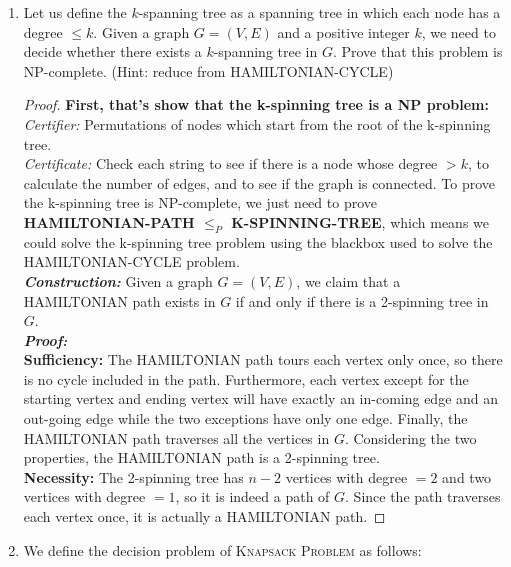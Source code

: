 \documentclass[12pt,a4paper]{article}
\theoremstyle{definition}
\begin{document}
\begin{enumerate}
\begin{proof}
	\\
	\textbf{Necessity:}
	If $G'$ has a clique of $K_b$, the set of whose vertices is $S$, the set $S$ is an independent set of $G$. Because all the incoming and outgoing edges of arbitrary vertex $u$ in $S$ are included in $K_b$, there is no edge connecting $u$ and any other nodes of $S$. As a result, $S$ is an independent set of $G$.
	\end{proof}
    \item Let us define the $k$-spanning tree as a spanning tree in which each node has a degree $\leqslant k$. Given a graph $G= (V,E)$ and a positive integer $k$, we need to decide whether there exists a $k$-spanning tree in $G$. Prove that this problem is NP-complete. (Hint: reduce from \textsc{HAMILTONIAN-CYCLE})
    \begin{proof}
    \textbf{First, that's show that the k-spinning tree is a NP problem:}
    \\
    \textit{Certifier:} Permutations of nodes which start from the root of the k-spinning tree.
    \\
    \textit{Certificate:} Check each string to see if there is a node whose degree $> k$, to calculate the number of edges, and to see if the graph is connected.
  	To prove the k-spinning tree is NP-complete, we just need to prove \textbf{\textsc{HAMILTONIAN-PATH }$\leq_P$\textsc{ K-SPINNING-TREE}}, which means we could solve the k-spinning tree problem using the blackbox used to solve the \textsc{HAMILTONIAN-CYCLE} problem. 
  	\\
  	\textit{\textbf{Construction: }}Given a graph $G=(V,E)$, we claim that a HAMILTONIAN path exists in $G$ if and only if there is a 2-spinning tree in $G$.
  	\\
  	\textbf{\textit{Proof:}}
  	\\
  	\textbf{Sufficiency:} The HAMILTONIAN path tours each vertex only once, so  there is no cycle included in the path. Furthermore, each vertex except for the starting vertex and ending vertex will have exactly an in-coming edge and an out-going edge while the two exceptions have only one edge. Finally, the HAMILTONIAN path traverses all the vertices in $G$. Considering the two properties, the HAMILTONIAN path is a 2-spinning tree.
  	\\
  	\textbf{Necessity:} The 2-spinning tree has $n-2$ vertices with degree $=2$ and two vertices with degree $=1$, so it is indeed a path of $G$. Since the path traverses each vertex once, it is actually a HAMILTONIAN path.
    \end{proof}
    \item We define the decision problem of \textsc{Knapsack Problem} as follows:
    

\end{enumerate}
\end{document}
